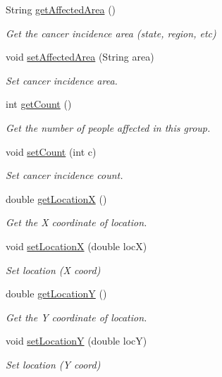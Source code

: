 \begin{DoxyCompactItemize}
String \hyperlink{classbridges_1_1data__src__dependent_1_1_cancer_incidence_ad4c0c709fa5da9c0f20b648052db5f26}{get\+Affected\+Area} ()
\begin{DoxyCompactList}\small\item\em Get the cancer incidence area (state, region, etc) \end{DoxyCompactList}\item 
void \hyperlink{classbridges_1_1data__src__dependent_1_1_cancer_incidence_a9c7f2d303da9498e5e6145439c5a6fbc}{set\+Affected\+Area} (String area)
\begin{DoxyCompactList}\small\item\em Set cancer incidence area. \end{DoxyCompactList}\item 
int \hyperlink{classbridges_1_1data__src__dependent_1_1_cancer_incidence_a8769cb18ddb590dc41a04a220174f3df}{get\+Count} ()
\begin{DoxyCompactList}\small\item\em Get the number of people affected in this group. \end{DoxyCompactList}\item 
void \hyperlink{classbridges_1_1data__src__dependent_1_1_cancer_incidence_a18099439ef6e35cf240b06f0e0158c72}{set\+Count} (int c)
\begin{DoxyCompactList}\small\item\em Set cancer incidence count. \end{DoxyCompactList}\item 
double \hyperlink{classbridges_1_1data__src__dependent_1_1_cancer_incidence_a24aa8144dcacd93a26c3c033471666df}{get\+LocationX} ()
\begin{DoxyCompactList}\small\item\em Get the X coordinate of location. \end{DoxyCompactList}\item 
void \hyperlink{classbridges_1_1data__src__dependent_1_1_cancer_incidence_a384149c413173fba51adad1b1769797a}{set\+LocationX} (double locX)
\begin{DoxyCompactList}\small\item\em Set location (X coord) \end{DoxyCompactList}\item 
double \hyperlink{classbridges_1_1data__src__dependent_1_1_cancer_incidence_a53b56a9931a1d02ee356c6258e245aa8}{get\+LocationY} ()
\begin{DoxyCompactList}\small\item\em Get the Y coordinate of location. \end{DoxyCompactList}\item 
void \hyperlink{classbridges_1_1data__src__dependent_1_1_cancer_incidence_a14c6921a71834c14d561bc7f2aa8a18e}{set\+LocationY} (double locY)
\begin{DoxyCompactList}\small\item\em Set location (Y coord) \end{DoxyCompactList}\end{DoxyCompactItemize}


